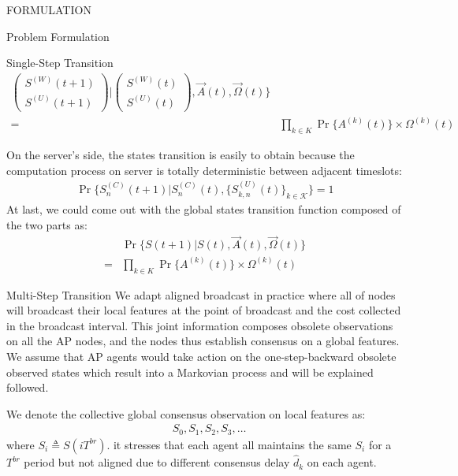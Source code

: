 \documentclass[10pt, conference, letterpaper]{IEEEtran}
\begin{document}
\begin{section}{FORMULATION}
\begin{subsection}{Problem Formulation}
\begin{subsubsection}{Single-Step Transition}
\begin{align}
\begin{pmatrix}
                        S^{(W)}(t+1) \\ S^{(U)}(t+1)
                    \end{pmatrix}
                    |
                    \begin{pmatrix}
                        S^{(W)}(t) \\ S^{(U)}(t)
                    \end{pmatrix}, \vec{A}(t), \vec{\Omega}(t)
                    \}
                    \nonumber\\
                    = &\prod_{k \in K} \Pr\{ A^{(k)}(t) \} \times \Omega^{(k)}(t)
                \end{align}

                On the server's side, the states transition is easily to obtain because the computation process on server is totally deterministic between adjacent timeslots:
                \begin{align}
                    \Pr\{ S_{n}^{(C)}(t+1) |S_{n}^{(C)}(t), \{S_{k,n}^{(U)}(t)\}_{k \in \mathcal{K}} \} = 1
                \end{align}
                At last, we could come out with the global states transition function composed of the two parts as:
                \begin{align}
                    & \Pr\{ S(t+1)|S(t), \vec{A}(t), \vec{\Omega}(t)  \}
                    \nonumber\\
                    = & \prod_{k \in K} \Pr\{ A^{(k)}(t) \} \times \Omega^{(k)}(t)
                \end{align}
            \end{subsubsection}

            \begin{subsubsection}{Multi-Step Transition}
                We adapt aligned broadcast in practice where all of nodes will broadcast their local features at the point of broadcast and the cost collected in the broadcast interval.
                This joint information composes obsolete observations on all the AP nodes, and the nodes thus establish consensus on a global features. We assume that AP agents would take action on the one-step-backward obsolete observed states which result into a Markovian process and will be explained followed.

                We denote the collective global consensus observation on local features as:
                \begin{align*}
                    & S_0, S_1, S_2, S_3, \dots
                \end{align*}
                where $S_i \triangleq S(iT^{br})$. it stresses that each agent all maintains the same $S_i$ for a $T^{br}$ period but not aligned due to different consensus delay $\hat{d}_k$ on each agent.


\end{subsubsection}
\end{subsection}
\end{section}
\end{document}
